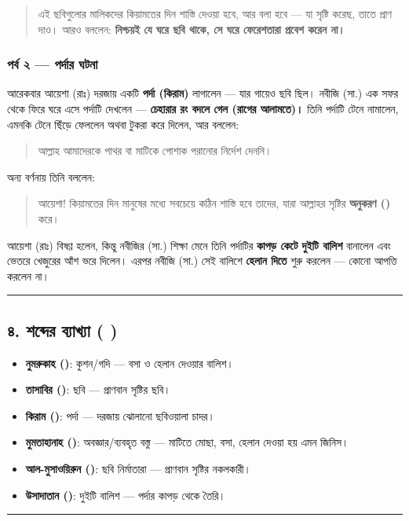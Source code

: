 \begin{quote}
এই ছবিগুলোর মালিকদের কিয়ামতের দিন শাস্তি দেওয়া হবে, আর বলা হবে — যা সৃষ্টি করেছ, তাতে প্রাণ দাও। আরও বললেন: \textbf{নিশ্চয়ই যে ঘরে ছবি থাকে, সে ঘরে ফেরেশতারা প্রবেশ করেন না।}
\end{quote}

\subsubsection*{পর্ব ২ — পর্দার ঘটনা}

আরেকবার আয়েশা (রাঃ) দরজায় একটি \textbf{পর্দা (কিরাম)} লাগালেন — যার গায়েও ছবি ছিল। নবীজি (সা.) এক সফর থেকে ফিরে ঘরে এসে পর্দাটি দেখলেন — \textbf{চেহারার রং বদলে গেল (রাগের আলামতে)।} তিনি পর্দাটি টেনে নামালেন, এমনকি টেনে ছিঁড়ে ফেললেন অথবা টুকরা করে দিলেন, আর বললেন:

\begin{quote}
আল্লাহ আমাদেরকে পাথর বা মাটিকে পোশাক পরানোর নির্দেশ দেননি।
\end{quote}

অন্য বর্ণনায় তিনি বললেন:

\begin{quote}
আয়েশা! কিয়ামতের দিন মানুষের মধ্যে সবচেয়ে কঠিন শাস্তি হবে তাদের, যারা আল্লাহর সৃষ্টির \textbf{অনুকরণ ()} করে।
\end{quote}

আয়েশা (রাঃ) বিষণ্ণ হলেন, কিন্তু নবীজির (সা.) শিক্ষা মেনে তিনি পর্দাটির \textbf{কাপড় কেটে দুইটি বালিশ} বানালেন এবং ভেতরে খেজুরের আঁশ ভরে দিলেন। এরপর নবীজি (সা.) সেই বালিশে \textbf{হেলান দিতে} শুরু করলেন — কোনো আপত্তি করলেন না।

\medskip\hrule\medskip

\subsection*{৪. শব্দের ব্যাখ্যা ( )}

\begin{itemize}
\item \textbf{নুমরুকাহ ()}: কুশন/গদি — বসা ও হেলান দেওয়ার বালিশ।
\item \textbf{তাসাবির ()}: ছবি — প্রাণবান সৃষ্টির ছবি।
\item \textbf{কিরাম ()}: পর্দা — দরজায় ঝোলানো ছবিওয়ালা চাদর।
\item \textbf{মুমতাহানাহ ()}: অবজ্ঞার/ব্যবহৃত বস্তু — মাটিতে মোছা, বসা, হেলান দেওয়া হয় এমন জিনিস।
\item \textbf{আল-মুসাওয়িরুন ()}: ছবি নির্মাতারা — প্রাণবান সৃষ্টির নকলকারী।
\item \textbf{উসাদাতান ()}: দুইটি বালিশ — পর্দার কাপড় থেকে তৈরি।
\end{itemize}
\medskip\hrule\medskip

